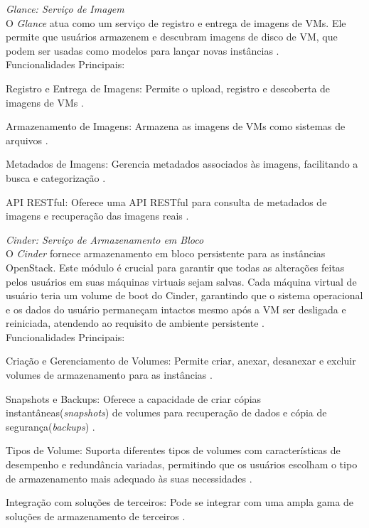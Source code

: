 \begin{description}
    \item \emph{Glance: Serviço de Imagem}\\
    O \textit{Glance} atua como um serviço de registro e entrega de imagens de VMs. Ele permite que usuários armazenem e descubram imagens de disco de VM, que podem ser usadas como modelos para lançar novas instâncias \cite{openstackglance}.\\
    Funcionalidades Principais:
    \begin{description}
        \item Registro e Entrega de Imagens: Permite o upload, registro e descoberta de imagens de VMs \cite{openstackglance}.
        \item Armazenamento de Imagens: Armazena as imagens de VMs como sistemas de arquivos \cite{openstackglance}.
        \item Metadados de Imagens: Gerencia metadados associados às imagens, facilitando a busca e categorização \cite{openstackglance}.
        \item API RESTful: Oferece uma API RESTful para consulta de metadados de imagens e recuperação das imagens reais \cite{openstackglance}.
    \end{description}

    \item \emph{Cinder: Serviço de Armazenamento em Bloco}\\
    O  \textit{Cinder} fornece armazenamento em bloco persistente para as instâncias OpenStack. Este módulo é crucial para garantir que todas as alterações feitas pelos usuários em suas máquinas virtuais sejam salvas. Cada máquina virtual de usuário teria um volume de boot do Cinder, garantindo que o sistema operacional e os dados do usuário permaneçam intactos mesmo após a VM ser desligada e reiniciada, atendendo ao requisito de ambiente persistente \cite{openstackcinder}.\\
    Funcionalidades Principais:
    \begin{description}
        \item Criação e Gerenciamento de Volumes: Permite criar, anexar, desanexar e excluir volumes de armazenamento para as instâncias \cite{openstackcinder}.
        \item Snapshots e Backups: Oferece a capacidade de criar cópias instantâneas(\textit{snapshots}) de volumes para recuperação de dados e cópia de segurança(\textit{backups}) \cite{openstackcinder}.
        \item Tipos de Volume: Suporta diferentes tipos de volumes com características de desempenho e redundância variadas, permitindo que os usuários escolham o tipo de armazenamento mais adequado às suas necessidades \cite{openstackcinder}.
        \item Integração com  soluções de terceiros: Pode se integrar com uma ampla gama de soluções de armazenamento de terceiros \cite{openstackcinder}.
    \end{description}


\end{description}
